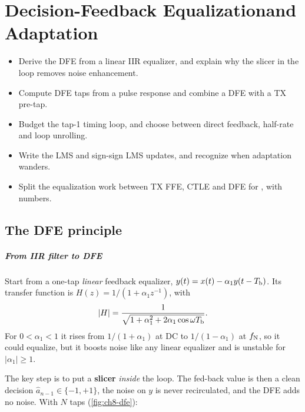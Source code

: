 \chapter[Decision-Feedback Equalization and Adaptation]{Decision-Feedback Equalization\newline and Adaptation}\label{ch:dfe}
\suppressfloats[t]

\begin{objectives}
\begin{itemize}
  \item Derive the DFE from a linear IIR equalizer, and explain why the slicer in the loop removes noise enhancement.
  \item Compute DFE taps from a pulse response and combine a DFE with a TX pre-tap.
  \item Budget the tap-1 timing loop, and choose between direct feedback, half-rate and loop unrolling.
  \item Write the LMS and sign-sign LMS updates, and recognize when adaptation wanders.
  \item Split the equalization work between TX FFE, CTLE and DFE for \OS{}, with numbers.
\end{itemize}
\end{objectives}

\section{The DFE principle}\label{sec:ch8-principle}

\paragraph{From IIR filter to DFE} Start from a one-tap \emph{linear} feedback equalizer, $y(t)=x(t)-\alpha_1y(t-T_\mathrm{b})$. Its transfer function is $H(z)=1/(1+\alpha_1z^{-1})$, with
\begin{equation}
  \lvert H\rvert=\frac{1}{\sqrt{1+\alpha_1^2+2\alpha_1\cos\omega T_\mathrm{b}}} .
  \label{eq:ch8-iir}
\end{equation}
For $0<\alpha_1<1$ it rises from $1/(1+\alpha_1)$ at DC to $1/(1-\alpha_1)$ at $f_\mathrm{N}$, so it could equalize, but it boosts noise like any linear equalizer and is unstable for $\lvert\alpha_1\rvert\ge1$.

The key step is to put a \textbf{slicer} \emph{inside} the loop. The fed-back value is then a clean decision $\hat a_{n-1}\in\{-1,+1\}$, the noise on $y$ is never recirculated, and the DFE adds no noise. With $N$ taps (\cref{fig:ch8-dfe}):


